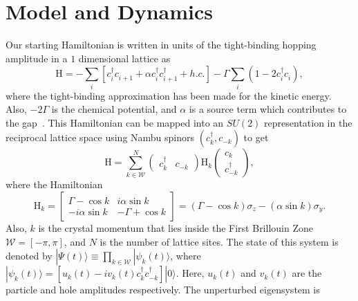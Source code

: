 \documentclass[a4paper,10pt]{article}
\begin{document}
\section{\sc Model and Dynamics}
\label{sec:tls}
Our starting Hamiltonian is written in units of the tight-binding hopping amplitude in a $1$ dimensional lattice as
\begin{equation}
\label{eq:hamiltonian}
\mathrm{H} = -\sum_i \left[c^\dagger_ic^{ }_{i+1} + \alpha c^\dagger_ic^\dagger_{i+1}+h.c.\right]-\Gamma\sum_i\left(1-2c^\dagger_ic^{ }_i\right),
\end{equation}
where the tight-binding approximation has been made for the kinetic energy. Also, $-2\Gamma$ is the chemical potential, and $\alpha$ is a source term which contributes to the gap~\cite{arti:garg}. This Hamiltonian can be mapped into an $SU(2)$ representation in the reciprocal lattice space using Nambu spinors $( c^\dagger_k , c_{-k})$ to get
\begin{equation}
\label{eq:hamiltonian:su2}
\mathrm{H}=\sum^N_{k\in\mathcal{W}} \begin{pmatrix}
                   c^\dagger_k & c_{-k}
                  \end{pmatrix}
		 \mathrm{H}_k
		  \begin{pmatrix}
                           c_k \\
			   c^\dagger_{-k}
                          \end{pmatrix},
\end{equation}
where the Hamiltonian
\begin{equation}
\label{eq:hk}
\mathrm{H}_k =  \begin{bmatrix}
		  \Gamma-\cos{k} & i\alpha \sin{k} \\
		  -i\alpha \sin{k} & -\Gamma+\cos{k}
		  \end{bmatrix}=\left(\Gamma-\cos{k}\right)\sigma_z-\left(\alpha\sin{k}\right)\sigma_y.
\end{equation}
Also, $k$ is the crystal momentum that lies inside the First Brillouin Zone $\mathcal{W}=[-\pi,\pi]$, and $N$ is the number of lattice sites. The state  of this system is denoted by $|\Psi(t)\rangle\equiv\prod_{k\in\mathcal{W}}|\psi_k(t)\rangle$, where $|\psi_{k}(t)\rangle = \left[u_{k}(t)-iv_{k}(t)c^\dagger_kc^\dagger_{-k}\right]|0\rangle$. Here, $u_k(t)$ and $v_k(t)$ are the particle and hole amplitudes respectively. The unperturbed eigensystem is 
\end{document}
